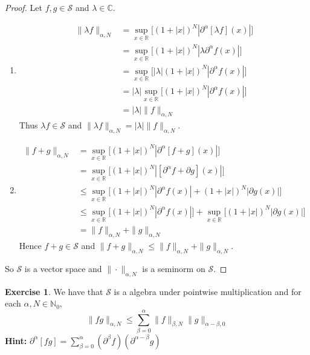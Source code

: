 \documentclass[12pt]{amsart}
\theoremstyle{definition}
\newtheorem{ex}[definition]{Exercise}
\newcommand{\p}{\partial}
\newcommand{\al}{\alpha}
\newcommand{\bet}{\beta}
\newcommand{\lam}{\lambda}
\newcommand{\C}{\mathbb{C}}
\newcommand{\N}{\mathbb{N}}
\newcommand{\R}{\mathbb{R}}
\newcommand{\MS}{\mathcal{S}}
\begin{document}
	\begin{proof} Let $f, g \in \MS$ and $\lam \in \C$.
		\begin{enumerate}
			\item 
			\begin{align*}
				\|\lam f\|_{\al, N}
				& = \sup_{x \in \R} \bigg[  (1 + |x|)^N |\p^{\al}[\lam f] (x)| \bigg] \\
				& = \sup_{x \in \R} \bigg[  (1 + |x|)^N |\lam \p^{\al}f (x)| \bigg] \\
				& = \sup_{x \in \R} \bigg[  |\lam| (1 + |x|)^N | \p^{\al}f (x)| \bigg] \\
				& = |\lam| \sup_{x \in \R} \bigg[ (1 + |x|)^N | \p^{\al}f (x)| \bigg] \\
				& = |\lam | \|f\|_{\al, N}
			\end{align*}
			Thus $\lam f \in \MS$ and $\|\lam f\|_{\al, N} = |\lam | \|f\|_{\al, N}$.
		\item \begin{align*}
			\|f  +  g\|_{\al, N} 
			& = \sup_{x \in \R} \bigg[  (1 + |x|)^N |\p^{\al}[f + g] (x)| \bigg] \\
			& = \sup_{x \in \R} \bigg[  (1 + |x|)^N |[\p^{\al} f  + \p g] (x)| \bigg] \\
			& \leq \sup_{x \in \R} \bigg[  (1 + |x|)^N |\p^{\al} f (x)|  +  (1 + |x|)^N |\p g (x)| \bigg] \\
			& \leq \sup_{x \in \R} \bigg[  (1 + |x|)^N |\p^{\al} f (x)| \bigg]   + \sup_{x \in \R} \bigg[ (1 + |x|)^N |\p g (x)| \bigg] \\
			& = \|f\|_{\al, N} + \|g\|_{\al, N} 
		\end{align*}
	 	Hence $f + g \in \MS$ and $\|f + g\|_{\al, N} \leq \|f\|_{\al, N} + \|g\|_{\al, N}$.
		\end{enumerate}
		So $\MS$ is a vector space and $\| \cdot \|_{\al, N}$ is a seminorm on $\MS$.
	\end{proof}

	\begin{ex}
		We have that $\MS$ is a algebra under pointwise multiplication and for each $\al, N \in \N_0$, 
		$$\|fg\|_{\al, N} \leq \sum\limits_{\bet=0}^\al  \|f\|_{\bet, N} \|g\|_{\al - \bet, 0}$$
		\textbf{Hint:} $\p^{\al}[fg] = \sum\limits_{\bet=0}^\al (\p^{\bet}f) (\p^{\al - \bet}g)$
	\end{ex}
\end{document}
